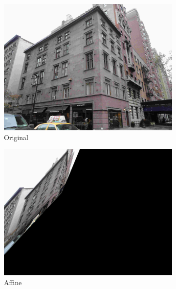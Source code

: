 \documentclass[paper=a4, fontsize=11pt]{scrartcl} %
\begin{document}
\begin{figure}
    \centering
    \begin{subfigure}[ht]{0.3\textwidth}
        \centering
        \includegraphics[width=\textwidth]{figures/img3.jpg}
        \caption{Original\label{fig:img3_tile}}    
    \end{subfigure}
    \hfill
    \begin{subfigure}[ht]{0.3\textwidth}  
        \centering
        \includegraphics[width=\textwidth]{figures/img3_aff.jpg}
        \caption{Affine\label{fig:img3_aff}}    
    \end{subfigure}
    \hfill
    \begin{subfigure}[ht]{0.3\textwidth}   
        \centering 

\end{subfigure}
\end{figure}
\end{document}
